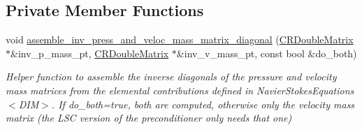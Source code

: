 \subsection*{Private Member Functions}
\begin{DoxyCompactItemize}
\item 
void \hyperlink{classoomph_1_1NavierStokesSchurComplementPreconditioner_ab45d7496790cc29a056b83c194aa2a1c}{assemble\+\_\+inv\+\_\+press\+\_\+and\+\_\+veloc\+\_\+mass\+\_\+matrix\+\_\+diagonal} (\hyperlink{classoomph_1_1CRDoubleMatrix}{C\+R\+Double\+Matrix} $\ast$\&inv\+\_\+p\+\_\+mass\+\_\+pt, \hyperlink{classoomph_1_1CRDoubleMatrix}{C\+R\+Double\+Matrix} $\ast$\&inv\+\_\+v\+\_\+mass\+\_\+pt, const bool \&do\+\_\+both)
\begin{DoxyCompactList}\small\item\em Helper function to assemble the inverse diagonals of the pressure and velocity mass matrices from the elemental contributions defined in Navier\+Stokes\+Equations$<$\+D\+I\+M$>$. If do\+\_\+both=true, both are computed, otherwise only the velocity mass matrix (the L\+SC version of the preconditioner only needs that one) \end{DoxyCompactList}\end{DoxyCompactItemize}
